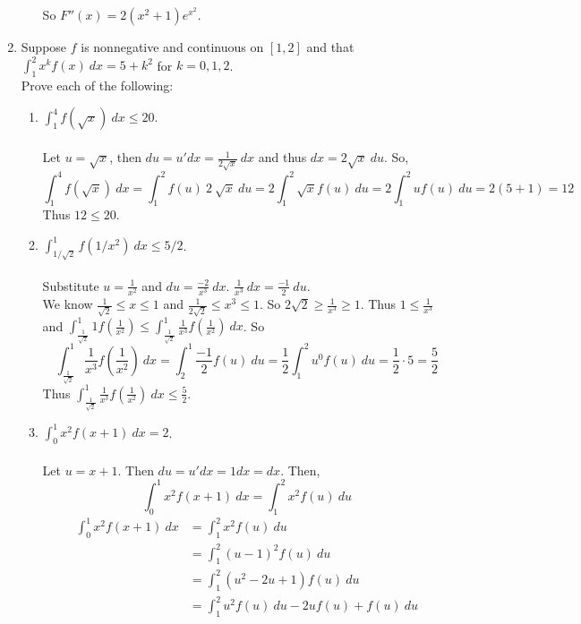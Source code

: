 \documentclass[12pt,letterpaper]{article}
\theoremstyle{case}
\theoremstyle{definition}
\begin{document}
\begin{enumerate}
\begin{enumerate}
			So $F''(x)=2(x^2+1)e^{x^2}$.\\
		\end{enumerate}
		\item Suppose $f$ is nonnegative and continuous on $[1,2]$ and that $\displaystyle\int_{1}^{2} x^k f(x)\ dx=5+k^2$ for $k=0,1,2$.
		\\Prove each of the following:
		\begin{enumerate}
			\item $\displaystyle\int_{1}^{4} f(\sqrt{x})\ dx \leq 20$.\\\\
			Let $u=\sqrt{x}$, then $du = u'dx = \frac{1}{2\sqrt{x}}\ dx$ and thus $dx = 2\sqrt{x}\ du$. So, 
			\[\int_{1}^{4} f(\sqrt{x})\ dx = \int_{1}^{2} f(u)\ 2\ \sqrt{x}\ du = 2 \int_{1}^{2} \sqrt{x} f(u)\ du = 2 \int_{1}^{2} u f(u)\ du=2(5+1)=12\]
			Thus $12 \leq 20$.\\
			\item $\displaystyle\int_{1/\sqrt{2}}^{1} f(1/x^2)\ dx \leq 5/2$.\\\\
			Substitute $u=\frac{1}{x^2}$ and $du=\frac{-2}{x^3}\ dx$. $\frac{1}{x^3}\ dx = \frac{-1}{2}\ du$.\\
			We know $\frac{1}{\sqrt{2}} \leq x \leq 1$ and $\frac{1}{2\sqrt{2}} \leq x^3 \leq 1$. So $2\sqrt{2} \geq \frac{1}{x^3} \geq 1$. Thus $1 \leq \frac{1}{x^3}$ and $\displaystyle\int_{\frac{1}{\sqrt{2}}}^{1} 1 f \left(\frac{1}{x^2}\right) \leq \displaystyle\int_{\frac{1}{\sqrt{2}}}^{1} \frac{1}{x^3} f\left(\frac{1}{x^2}\right)\ dx$. So
			\[\int_{\frac{1}{\sqrt{2}}}^{1} \frac{1}{x^3} f \left(\frac{1}{x^2}\right)\ dx = \int_{2}^{1} \frac{-1}{2} f(u)\ du = \frac{1}{2} \int_{1}^{2} u^0 f(u)\ du = \frac{1}{2} \cdot 5 = \frac{5}{2}\]
			Thus $\displaystyle\int_{\frac{1}{\sqrt{2}}}^{1} \frac{1}{x^3} f \left(\frac{1}{x^2}\right)\ dx \leq \frac{5}{2}$.
			\item $\displaystyle\int_{0}^{1} x^2 f(x+1)\ dx =2$. \\\\
			Let $u=x+1$. Then $du=u'dx=1dx=dx$. Then,
			\[\int_{0}^{1} x^2 f(x+1)\ dx = \int_{1}^{2} x^2 f(u)\ du\]
			\begin{align*}
				\int_{0}^{1} x^2 f(x+1)\ dx &= \int_{1}^{2} x^2 f(u)\ du \\
				&= \int_{1}^{2} (u-1)^2f(u)\ du \\
				&= \int_{1}^{2} (u^2-2u+1) f(u)\ du \\
				&= \int_{1}^{2} u^2 f(u)\ du -2uf(u)+f(u)\ du \\

\end{align*}
\end{enumerate}
\end{enumerate}
\end{document}

